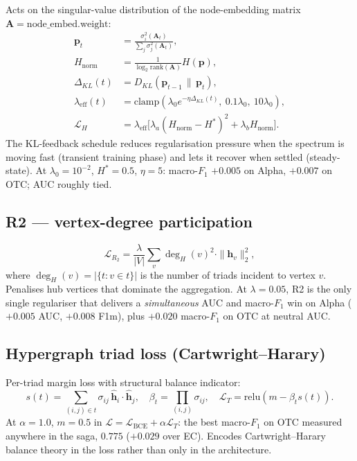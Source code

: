 \documentclass[11pt, a4paper]{article}
\begin{document}
Acts on the singular-value distribution of the node-embedding
matrix $\mathbf{A} = \mathrm{node\_embed.weight}$:
\begin{align*}
\mathbf{p}_t &= \frac{\sigma_i^2(\mathbf{A}_t)}{\sum_j \sigma_j^2(\mathbf{A}_t)}, \\
H_{\mathrm{norm}} &= \tfrac{1}{\log_2 \mathrm{rank}(\mathbf{A})} H(\mathbf{p}), \\
\Delta_{KL}(t) &= D_{KL}(\mathbf{p}_{t-1} \,\|\, \mathbf{p}_t), \\
\lambda_{\mathrm{eff}}(t) &= \mathrm{clamp}(\lambda_0 e^{-\eta \Delta_{KL}(t)},\ 0.1\lambda_0,\ 10\lambda_0), \\
\mathcal{L}_H &= \lambda_{\mathrm{eff}} \bigl[\lambda_a (H_{\mathrm{norm}} - H^*)^2 + \lambda_b H_{\mathrm{norm}}\bigr].
\end{align*}
The KL-feedback schedule reduces regularisation pressure when the
spectrum is moving fast (transient training phase) and lets it
recover when settled (steady-state). At $\lambda_0\!=\!10^{-2}$,
$H^*\!=\!0.5$, $\eta\!=\!5$: macro-$F_1$ $+0.005$ on Alpha,
$+0.007$ on OTC; AUC roughly tied.

\subsection{R2 — vertex-degree participation}
\label{sec:reg-r2}

\[
\mathcal{L}_{R_2} = \frac{\lambda}{|V|} \sum_v \deg_H(v)^2 \cdot \|\mathbf{h}_v\|_2^2,
\]
where $\deg_H(v) = |\{t : v \in t\}|$ is the number of triads
incident to vertex $v$. Penalises hub vertices that dominate the
aggregation. At $\lambda\!=\!0.05$, R2 is the only single regulariser
that delivers a \emph{simultaneous} AUC and macro-$F_1$ win on Alpha
($+0.005$ AUC, $+0.008$ F1m), plus $+0.020$ macro-$F_1$ on OTC at
neutral AUC.

\subsection{Hypergraph triad loss (Cartwright--Harary)}
\label{sec:reg-triad}

Per-triad margin loss with structural balance indicator:
\[
s(t) = \sum_{(i, j) \in t} \sigma_{ij}\, \hat{\mathbf{h}}_i \cdot \hat{\mathbf{h}}_j, \quad
\beta_t = \prod_{(i, j)} \sigma_{ij}, \quad
\mathcal{L}_T = \mathrm{relu}(m - \beta_t s(t)).
\]
At $\alpha\!=\!1.0$, $m\!=\!0.5$ in $\mathcal{L} = \mathcal{L}_{\mathrm{BCE}} + \alpha \mathcal{L}_T$:
the best macro-$F_1$ on OTC measured anywhere in the saga, $0.775$
($+0.029$ over EC). Encodes Cartwright--Harary balance theory in the
loss rather than only in the architecture.
\end{document}
